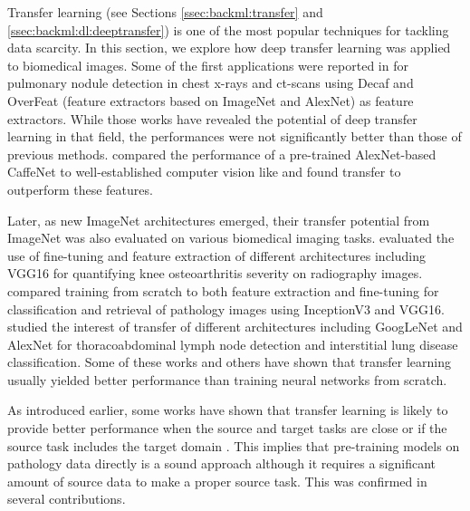 Transfer learning (see Sections \ref{ssec:backml:transfer} and \ref{ssec:backml:dl:deeptransfer}) is one of the most popular techniques for tackling data scarcity. In this section, we explore how deep transfer learning was applied to biomedical images. Some of the first applications were reported in \cite{bar2015chest,ciompi2015automatic,van2015off} for pulmonary nodule detection in chest x-rays and \acrshort{ct}-scans using Decaf and OverFeat (feature extractors based on ImageNet and AlexNet) as feature extractors. While those works have revealed the potential of deep transfer learning in that field, the performances were not significantly better than those of previous methods. \citeauthor{ravishankar2016understanding} \cite{ravishankar2016understanding} compared the performance of a pre-trained AlexNet-based CaffeNet \cite{jia2014caffe} to well-established computer vision like  \cite{mcconnell1986method} and found transfer to outperform these features.

Later, as new ImageNet architectures emerged, their transfer potential from ImageNet was also evaluated on various biomedical imaging tasks. \citeauthor{antony2016quantifying} \cite{antony2016quantifying} evaluated the use of fine-tuning and feature extraction of different architectures including VGG16 for quantifying knee osteoarthritis severity on radiography images. \citeauthor{kieffer2017convolutional} \cite{kieffer2017convolutional} compared training from scratch to both feature extraction and fine-tuning for classification and retrieval of pathology images using InceptionV3 and VGG16. \citeauthor{shin2016deep} \cite{shin2016deep} studied the interest of transfer of different architectures including GoogLeNet and AlexNet for thoracoabdominal lymph node detection and interstitial lung disease classification. Some of these works and others \cite{ponzio2019dealing, tajbakhsh2016convolutional} have shown that transfer learning usually yielded better performance than training neural networks from scratch.

As introduced earlier, some works have shown that transfer learning is likely to provide better performance when the source and target tasks are close \cite{yosinski2014transferable} or if the source task includes the target domain \cite{mensink2021factors}. This implies that pre-training models on pathology data directly is a sound approach although it requires a significant amount of source data to make a proper source task. This was confirmed in several contributions.

